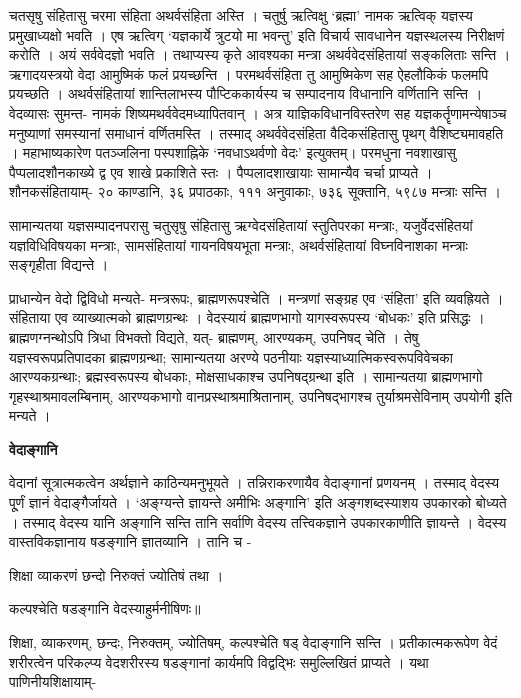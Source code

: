 \documentclass[11pt, a5paper]{article}
\newcommand{\customparagraph}[1]{
    \noindent \textbf{#1} \par
    \penalty 10000 %
    \vspace{0.1cm plus 0.05cm minus 0.02cm}
    \penalty 10000 %
}
\begin{document}
चतसृषु संहितासु चरमा संहिता अथर्वसंहिता अस्ति । चतुर्षु ऋत्विक्षु ‘ब्रह्मा’ नामक ऋत्विक् यज्ञस्य प्रमुखाध्यक्षो भवति । एष ऋत्विग् ‘यज्ञकार्ये त्रुटयो मा भवन्तु’ इति विचार्य सावधानेन यज्ञस्थलस्य निरीक्षणं करोति । अयं सर्ववेदज्ञो भवति । तथाप्यस्य कृते आवश्यका मन्त्रा अथर्ववेदसंहितायां सङ्‌कलिताः सन्ति । ऋगादयस्त्रयो वेदा आमुष्मिकं फलं प्रयच्छन्ति । परमथर्वसंहिता तु आमुष्मिकेण सह ऐहलौकिकं फलमपि प्रयच्छति । अथर्वसंहितायां शान्तिलाभस्य पौप्टिककार्यस्य च सम्पादनाय विधानानि वर्णितानि सन्ति । वेदव्यासः सुमन्त- नामकं शिष्यमथर्ववेदमध्यापितवान् । अत्र याज्ञिकविधानविस्तरेण सह यज्ञकर्तॄणामन्येषाञ्च मनुष्याणां समस्यानां समाधानं वर्णितमस्ति । तस्माद् अथर्ववेदसंहिता वैदिकसंहितासु पृथग् वैशिष्ट्यमावहति । महाभाष्यकारेण पतञ्जलिना पस्पशाह्निके ‘नवधाऽथर्वणो वेदः’ इत्युक्तम्। परमधुना नवशाखासु पैप्पलादशौनकाख्ये द्व एव शाखे प्रकाशिते स्तः । पैप्पलादशाखायाः सामान्यैव चर्चा प्राप्यते । शौनकसंहितायाम्- २० काण्डानि, ३६ प्रपाठकाः, १११ अनुवाकाः, ७३६ सूक्तानि, ५९८७ मन्त्राः सन्ति ।

सामान्यतया यज्ञसम्पादनपरासु चतुसृषु संहितासु ऋग्वेदसंहितायां स्तुतिपरका मन्त्राः, यजुर्वेदसंहितयां यज्ञविधिविषयका मन्त्राः, सामसंहितायां गायनविषयभूता मन्त्राः, अथर्वसंहितायां विघ्नविनाशका मन्त्राः सङ‌्‌गृहीता विद्यन्ते ।

प्राधान्येन वेदो द्विविधो मन्यते- मन्त्ररूपः, ब्राह्मणरूपश्चेति । मन्त्रणां सङ्ग्रह एव ‘संहिता’ इति व्यवह्रियते । संहिताया एव व्याख्यात्मको ब्राह्मणग्रन्थः । वेदस्यायं ब्राह्मणभागो यागस्वरूपस्य ‘बोधकः’ इति प्रसिद्धः । ब्राह्मणग्नन्थोऽपि त्रिधा विभक्तो विद्यते, यत्- ब्राह्मणम्, आरण्यकम्, उपनिषद् चेति । तेषु यज्ञस्वरूपप्रतिपादका ब्राह्मणग्रन्था; सामान्यतया अरण्ये पठनीयाः यज्ञस्याध्यात्मिकस्वरूपविवेचका आरण्यकग्रन्थाः; ब्रह्मस्वरूपस्य बोधकाः, मोक्षसाधकाश्च उपनिषद्‌ग्रन्था इति । सामान्यतया ब्राह्मणभागो गृहस्थाश्रमावलम्बिनाम्, आरण्यकभागो वानप्रस्थाश्रमाश्रितानाम्, उपनिषद्भागश्च तुर्याश्रमसेविनाम् उपयोगी इति मन्यते ।

\customparagraph{\textbf{वेदाङ्गानि}}

वेदानां सूत्रात्मकत्वेन अर्थज्ञाने काठिन्यमनुभूयते । तन्निराकरणायैव वेदाङ्गानां प्रणयनम् । तस्माद् वेदस्य पू्र्णं ज्ञानं वेदाङ्गैर्जायते । ‘अङ्‌ग्यन्ते ज्ञायन्ते अमीभिः अङ्गानि’ इति अङ्गशब्दस्याशय उपकारको बोध्यते । तस्माद् वेदस्य यानि अङ्गानि सन्ति तानि सर्वाणि वेदस्य तत्त्विकज्ञाने उपकारकाणीति ज्ञायन्ते । वेदस्य वास्तविकज्ञानाय षडङ्गानि ज्ञातव्यानि । तानि च -

शिक्षा व्याकरणं छन्दो निरुक्तं ज्योतिषं तथा ।

कल्पश्चेति षडङ्गानि वेदस्याहुर्मनीषिणः॥

शिक्षा, व्याकरणम्, छन्दः, निरुक्तम्, ज्योतिषम्, कल्पश्चेति षड्‌ वेदाङ्गानि सन्ति । प्रतीकात्मकरूपेण वेदं शरीरत्वेन परिकल्प्य वेदशरीरस्य षडङ्गानां कार्यमपि विद्वद्भिः समुल्लिखितं प्राप्यते । यथा पाणिनीयशिक्षायाम्-
\end{document}
